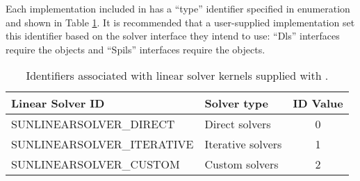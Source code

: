 Each {\sunlinsol} implementation included in {\sundials} has a ``type''
identifier specified in enumeration and shown in Table \ref{t:linsolIDs}.
It is recommended that a user-supplied {\sunlinsol} implementation set
this identifier based on the {\sundials} solver interface they intend
to use: ``Dls'' interfaces require the 
{\sunlinsol} objects and ``Spils'' interfaces require the 
 objects. 

\begin{table}
\centering
\caption{Identifiers associated with linear solver kernels supplied with {\sundials}.}
\label{t:linsolIDs}
\medskip
\begin{tabular}{|l|l|c|}
\hline
{\bf Linear Solver ID} & {\bf Solver type} & {\bf ID Value} \\
\hline
SUNLINEARSOLVER\_DIRECT      & Direct solvers     & 0 \\ 
SUNLINEARSOLVER\_ITERATIVE   & Iterative solvers  & 1 \\
SUNLINEARSOLVER\_CUSTOM      & Custom solvers     & 2 \\
\hline
\end{tabular}
\end{table}





\newlength{\colOne}
\newlength{\colTwo}
\setlength{\colTwo}{\textwidth}
\addtolength{\colTwo}{-0.5in}
\addtolength{\colTwo}{-\colOne}

